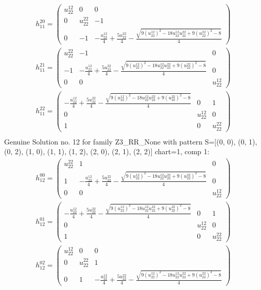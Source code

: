 \documentclass[a4paper, 11pt, twoside, onecolumn]{article}
\begin{document}
\begin{landscape}
\begin{gather*}
	 h_11^{20}=\begin{pmatrix}u^{12}_{22} & 0 & 0\\0 & u^{22}_{22} & -1\\0 & -1 & - \frac{u^{12}_{22}}{4} + \frac{5 u^{22}_{22}}{4} - \frac{\sqrt{9 \left(u^{12}_{22}\right)^{2} - 18 u^{12}_{22} u^{22}_{22} + 9 \left(u^{22}_{22}\right)^{2} - 8}}{4}\end{pmatrix}\\ 
	 h_11^{21}=\begin{pmatrix}u^{22}_{22} & -1 & 0\\-1 & - \frac{u^{12}_{22}}{4} + \frac{5 u^{22}_{22}}{4} - \frac{\sqrt{9 \left(u^{12}_{22}\right)^{2} - 18 u^{12}_{22} u^{22}_{22} + 9 \left(u^{22}_{22}\right)^{2} - 8}}{4} & 0\\0 & 0 & u^{12}_{22}\end{pmatrix}\\ 
	 h_11^{22}=\begin{pmatrix}- \frac{u^{12}_{22}}{4} + \frac{5 u^{22}_{22}}{4} - \frac{\sqrt{9 \left(u^{12}_{22}\right)^{2} - 18 u^{12}_{22} u^{22}_{22} + 9 \left(u^{22}_{22}\right)^{2} - 8}}{4} & 0 & 1\\0 & u^{12}_{22} & 0\\1 & 0 & u^{22}_{22}\end{pmatrix}\\ 
\end{gather*} 
Genuine Solution no. 12 for family Z3_RR_None with pattern S=[(0, 0), (0, 1), (0, 2), (1, 0), (1, 1), (1, 2), (2, 0), (2, 1), (2, 2)] chart=1, comp 1: 
\begin{gather*} 
	 h_12^{00}=\begin{pmatrix}u^{22}_{22} & 1 & 0\\1 & - \frac{u^{12}_{22}}{4} + \frac{5 u^{22}_{22}}{4} - \frac{\sqrt{9 \left(u^{12}_{22}\right)^{2} - 18 u^{12}_{22} u^{22}_{22} + 9 \left(u^{22}_{22}\right)^{2} - 8}}{4} & 0\\0 & 0 & u^{12}_{22}\end{pmatrix}\\ 
	 h_12^{01}=\begin{pmatrix}- \frac{u^{12}_{22}}{4} + \frac{5 u^{22}_{22}}{4} - \frac{\sqrt{9 \left(u^{12}_{22}\right)^{2} - 18 u^{12}_{22} u^{22}_{22} + 9 \left(u^{22}_{22}\right)^{2} - 8}}{4} & 0 & 1\\0 & u^{12}_{22} & 0\\1 & 0 & u^{22}_{22}\end{pmatrix}\\ 
	 h_12^{02}=\begin{pmatrix}u^{12}_{22} & 0 & 0\\0 & u^{22}_{22} & 1\\0 & 1 & - \frac{u^{12}_{22}}{4} + \frac{5 u^{22}_{22}}{4} - \frac{\sqrt{9 \left(u^{12}_{22}\right)^{2} - 18 u^{12}_{22} u^{22}_{22} + 9 \left(u^{22}_{22}\right)^{2} - 8}}{4}\end{pmatrix}\\ 

\end{gather*}
\end{landscape}
\end{document}
